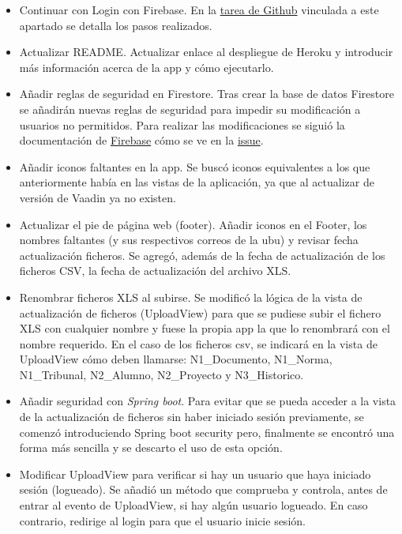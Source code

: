 \begin{itemize}
	\tightlist
	\item Continuar con Login con Firebase.
		En la \href{https://github.com/dbo1001/Gestor-TFG-2021/issues/122}{tarea de Github} vinculada a este apartado se detalla los pasos realizados.
	\item Actualizar README.
		Actualizar enlace al despliegue de Heroku y introducir más información acerca de la app y cómo ejecutarlo.
	\item Añadir reglas de seguridad en Firestore.
		Tras crear la base de datos Firestore se añadirán nuevas reglas de seguridad para impedir su modificación a usuarios no permitidos. Para realizar las modificaciones se siguió la documentación de \href{https://firebase.google.com/docs/firestore/security/insecure-rules}{Firebase} cómo se ve en la \href{https://github.com/dbo1001/Gestor-TFG-2021/issues/130}{issue}.
	\item Añadir iconos faltantes en la app.
		Se buscó iconos equivalentes a los que anteriormente había en las vistas de la aplicación, ya que al actualizar de versión de Vaadin ya no existen.
	\item Actualizar el pie de página web (footer).
		Añadir iconos en el Footer, los nombres faltantes (y sus respectivos correos de la ubu) y revisar fecha actualización ficheros. Se agregó, además de la fecha de actualización de los ficheros CSV, la fecha de actualización del archivo XLS.
	\item Renombrar ficheros XLS al subirse.
		Se modificó la lógica de la vista de actualización de ficheros (UploadView) para que se pudiese subir el fichero XLS con cualquier nombre y fuese la propia app la que lo renombrará con el nombre requerido. En el caso de los ficheros csv, se indicará en la vista de UploadView cómo deben llamarse: N1\_Documento, N1\_Norma, N1\_Tribunal, N2\_Alumno, N2\_Proyecto y N3\_Historico.
	\item Añadir seguridad con \emph{Spring boot}.
		Para evitar que se pueda acceder a la vista de la actualización de ficheros sin haber iniciado sesión previamente, se comenzó introduciendo Spring boot security pero, finalmente se encontró una forma más sencilla y se descarto el uso de esta opción.
	\item Modificar UploadView para verificar si hay un usuario que haya iniciado sesión (logueado).
		Se añadió un método que comprueba y controla, antes de entrar al evento de UploadView, si hay algún usuario logueado. En caso contrario, redirige al login para que el usuario inicie sesión. 
	
\end{itemize}

